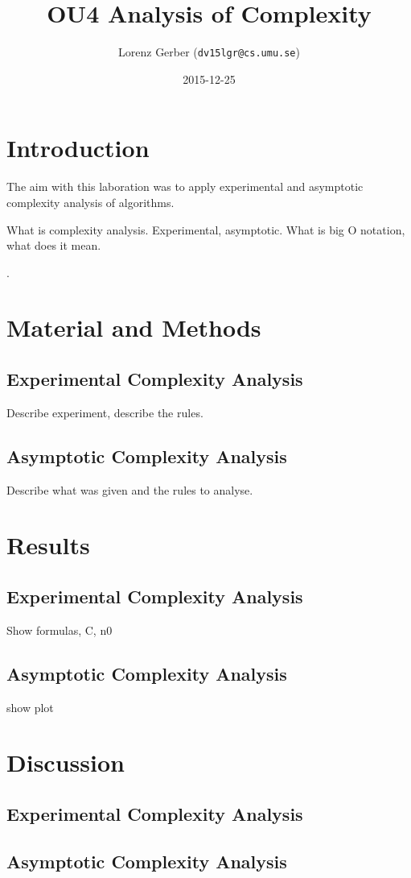 \documentclass[a4paper,11pt,twoside]{article}
\title{OU4 Analysis of Complexity}
\author{Lorenz Gerber  ({\tt{dv15lgr@cs.umu.se}})}
\date{2015-12-25}
\begin{document}
\lstset{language=C}
\maketitle

\tableofcontents
\newpage

\section{Introduction} 
The aim with this laboration was to apply experimental and asymptotic
complexity analysis of algorithms. 

What is complexity analysis. Experimental, asymptotic. What is big O
notation, what does it mean.
 
\cite[pp. 117 -- 132]{janlert2000}.

\section{Material and Methods}

\subsection{Experimental Complexity Analysis}
Describe experiment, describe the rules.

\subsection{Asymptotic Complexity Analysis}
Describe what was given and the rules to analyse.

\section{Results}
\subsection{Experimental Complexity Analysis}
Show formulas, C, n0

\subsection{Asymptotic Complexity Analysis}
show plot

\section{Discussion}
\subsection{Experimental Complexity Analysis}

\subsection{Asymptotic Complexity Analysis}



\end{document}
